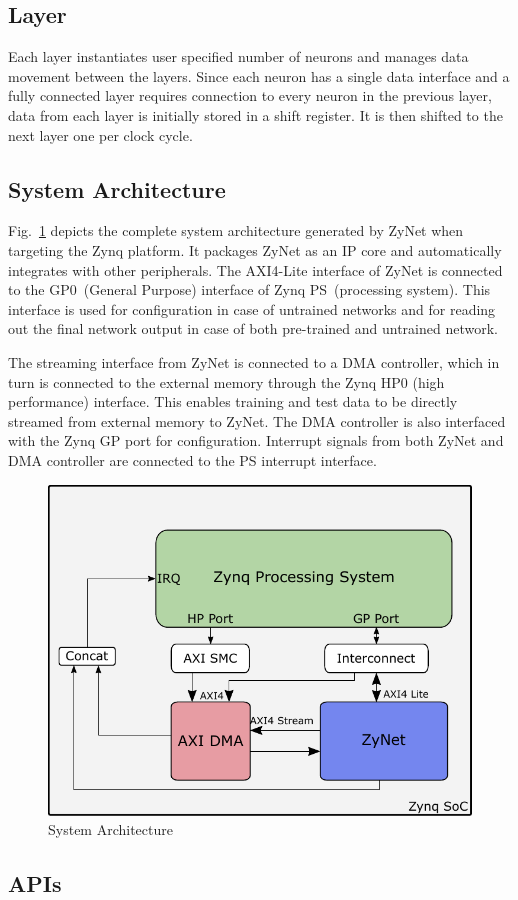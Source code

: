 \subsection{Layer}
Each layer instantiates user specified number of neurons and manages data movement between the layers.
Since each neuron has a single data interface and a fully connected layer requires connection to every neuron in the previous layer, data from each layer is initially stored in a shift register.
It is then shifted to the next layer one per clock cycle.

\subsection{System Architecture}
Fig.~\ref{fig:sysarch} depicts the complete system architecture generated by ZyNet when targeting the Zynq platform.
It packages ZyNet as an IP core and automatically integrates with other peripherals.
The AXI4-Lite interface of ZyNet is connected to the GP0~(General Purpose) interface of Zynq PS~(processing system).
This interface is used for configuration in case of untrained networks and for reading out the final network output in case of both pre-trained and untrained network.

The streaming interface from ZyNet is connected to a DMA controller, which in turn is connected to the external memory through the Zynq HP0 (high performance) interface.
This enables training and test data to be directly streamed from external memory to ZyNet.
The DMA controller is also interfaced with the Zynq GP port for configuration.
Interrupt signals from both ZyNet and DMA controller are connected to the PS interrupt interface.
 
\begin{figure}[!t]
\centering
   \includegraphics[width=0.8\columnwidth]{Figures/arch.pdf}
   \caption{System Architecture}
   \label{fig:sysarch}
\end{figure}


\subsection{APIs}

